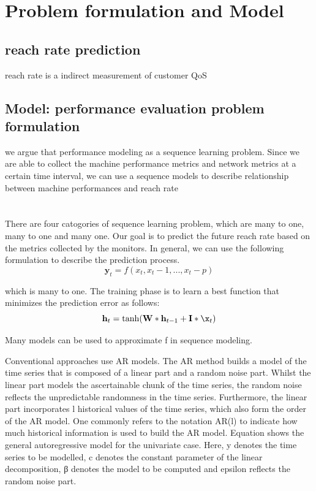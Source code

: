 \documentclass[review]{elsarticle}
\newcommand{\dabiaolv}{reach rate }
\begin{document}
\section{Problem formulation and Model}
\subsection{\dabiaolv prediction}
\dabiaolv is a indirect measurement of customer QoS
\subsection{Model: performance evaluation problem formulation}
we argue that performance modeling as a sequence learning problem. 
Since we are able to collect the machine performance metrics and network metrics at a certain time interval, we can use a sequence models to describe relationship between machine performances and \dabiaolv
\section{}
There are four catogories of sequence learning problem, which are many to one, many to one and many one. 
Our goal is to predict the future \dabiaolv based on the metrics collected by the monitors. In general, we can use the following formulation to describe the prediction process.
\begin{equation}
	\mathbf y_t = f(x_t,x_t-1,...,x_t-p)
\end{equation}

which is many to one. The training phase is to learn a best function that minimizes the prediction error as follows:
\begin{equation}
	\mathbf h_t = \tanh(\mathbf W * \mathbf h_{t-1} + \mathbf I * \x_t)
\end{equation}

Many models can be used to approximate f in sequence modeling. 

Conventional approaches use AR models. The AR method builds a model of the time series that is composed of a linear part and a random noise part. Whilst the linear part models the ascertainable chunk of the time series, the random noise reflects the unpredictable randomness in the time series. Furthermore, the linear part incorporates l historical values of the time series, which also form the order of the AR model. One commonly refers to the notation AR(l) to indicate how much historical information is used to build the AR model. Equation shows the general autoregressive model for the univariate case. Here, y denotes the time series to be modelled, c denotes the constant parameter of the linear decomposition, β denotes the model to be computed and epsilon reflects the random noise part.
\end{document}
